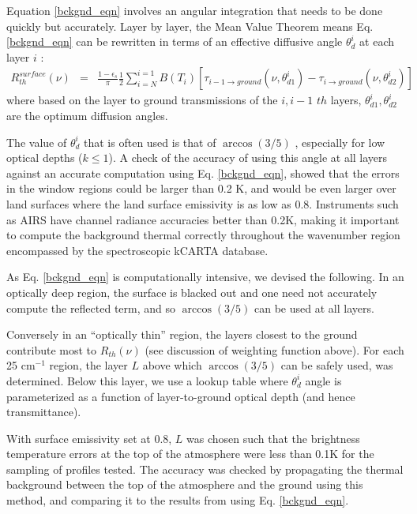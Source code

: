 \documentclass[11pt]{article}
\newcommand{\kc}{\textsf{kCARTA}\xspace}
\newcommand{\wn}{cm$^{-1}$\xspace}
\begin{document}
Equation \ref{bckgnd_eqn} involves an angular integration that needs to
be done quickly but accurately. Layer by layer, the
Mean Value Theorem means Eq. \ref{bckgnd_eqn} can be rewritten in terms of an
effective diffusive angle $\theta^{i}_{d}$ at each layer $i$ :
\begin{eqnarray*}
R_{th}^{surface}(\nu) & =
                 & \frac{1 - \epsilon_{s}}{\pi} \frac{1}{2} \sum_{i=N}^{i=1}
B(T_{i}) \left[ \tau_{i-1 \rightarrow ground}
(\nu,\theta^{i}_{d1})-\tau_{i \rightarrow ground}(\nu,\theta^{i}_{d2}) \right]
\end{eqnarray*}
where based on the layer to ground transmissions of the $i,i-1$ $th$
layers,  $\theta^{i}_{d1},\theta^{i}_{d2}$ are the optimum diffusion angles.

The value of $\theta^{i}_{d}$ that is often used is that of $\arccos(3/5)$
\cite{lio:80}, especially for low optical depths ($k \le 1$).  A check of the
accuracy of using this angle at all layers against an accurate computation
using Eq. \ref{bckgnd_eqn}, showed that the errors in the window regions could
be larger than 0.2 K, and would be even larger over land surfaces where the
land surface emissivity is as low as 0.8. Instruments such as AIRS have
channel radiance accuracies better than 0.2K, making it important to compute
the background thermal correctly throughout the wavenumber region encompassed
by the spectroscopic \kc database.

As Eq. \ref{bckgnd_eqn} is computationally intensive, we devised the following.
In an optically deep region, the surface is blacked out and one need not
accurately compute the reflected term, and so $\arccos(3/5)$ can be used
at all layers.

Conversely in an ``optically thin'' region, the layers closest to the ground
contribute most to $R_{th}(\nu)$ (see discussion of weighting function above).
For each 25 \wn region, the layer $L$ above which $\arccos(3/5)$ can be
safely used, was determined. Below this layer, we use a lookup table where
$\theta^{i}_{d}$ angle is parameterized as a function of layer-to-ground
optical depth (and hence transmittance).

With surface emissivity set at 0.8, $L$ was chosen such that the brightness
temperature errors at the top of the atmosphere were less than 0.1K for the
sampling of profiles tested. The accuracy was checked by propagating the
thermal background between the top of the atmosphere and the ground using this
method, and comparing it to the results from using Eq. \ref{bckgnd_eqn}.
\end{document}
